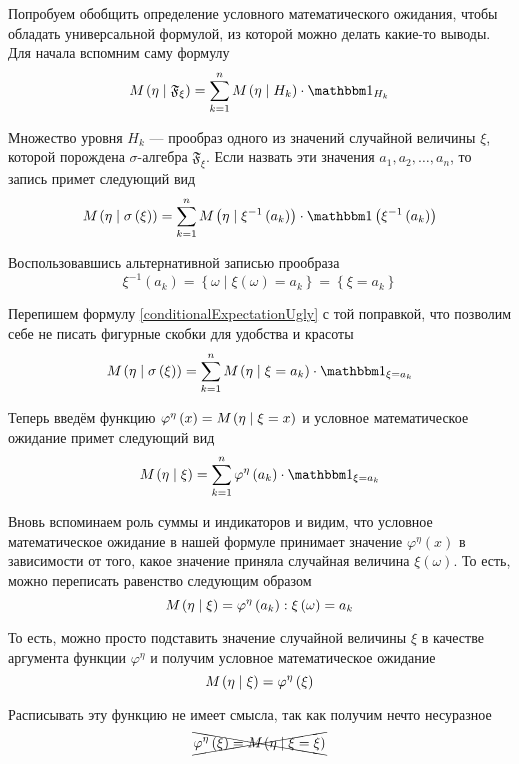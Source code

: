 Попробуем обобщить определение условного математического ожидания,
чтобы обладать универсальной формулой, из которой можно делать какие-то выводы.
Для начала вспомним саму формулу
$$\mean{\left( \eta \mid \mathfrak{F}_\xi \right)}
    = \sum_{k=1}^n \mean{\left( \eta \mid H_k \right)} \cdot \indicatorof{H_k}$$

Множество уровня $H_k$ --- прообраз одного из значений случайной величины $\xi$,
которой порождена $\sigma$-алгебра $\mathfrak{F}_\xi$.
Если назвать эти значения $a_1, a_2, \dots, a_n$, то запись примет следующий вид
\begin{equation}\label{conditionalExpectationUgly}
    \mean{\left( \eta \mid \sigma\left( \xi \right) \right)}
        = \sum_{k=1}^n \mean{\left( \eta \mid \xi^{-1}\left( a_k \right) \right)
            \cdot \indicator{\xi^{-1}\left( a_k \right)}}
\end{equation}

Воспользовавшись альтернативной записью прообраза
$$\xi^{-1}\left( a_k \right)
    = \left\{ \omega \mid \xi\left( \omega \right) = a_k \right\}
    = \left\{ \xi = a_k \right\}$$

Перепишем формулу \eqref{conditionalExpectationUgly} с той поправкой,
что позволим себе не писать фигурные скобки для удобства и красоты
$$\mean{\left( \eta \mid \sigma\left( \xi \right) \right)}
    = \sum_{k=1}^n \mean{\left( \eta \mid \xi = a_k \right)
        \cdot \indicatorof{\xi = a_k}}$$

Теперь введём функцию
$\varphi^{\eta}\left( x \right) = M_{} \left( \eta \mid \xi=x \right)$
и условное математическое ожидание примет следующий вид
$$\mean{\left( \eta \mid \xi \right)}
    = \sum_{k=1}^n \varphi^{\eta}\left( a_k \right)
        \cdot \indicatorof{\xi = a_k}$$

Вновь вспоминаем роль суммы и индикаторов и видим,
что условное математическое ожидание в нашей формуле
принимает значение $\varphi^{\eta}\left( x \right)$ в зависимости от того,
какое значение приняла случайная величина $\xi\left( \omega \right)$.
То есть, можно переписать равенство следующим образом
$$M_{} \left( \eta \mid \xi \right)
    = \varphi^{\eta}\left( a_k \right): \xi\left( \omega \right) = a_k$$

То есть, можно просто подставить значение случайной величины $\xi$
в качестве аргумента функции $\varphi^{\eta}$
и получим условное математическое ожидание
$$M_{} \left( \eta \mid \xi \right)
    = \varphi^{\eta}\left( \xi \right)$$

Расписывать эту функцию не имеет смысла, так как получим нечто несуразное
$$\xcancel{\varphi^{\eta}\left( \xi \right)
    =M_{} \left( \eta \mid \xi=\xi \right)}$$

